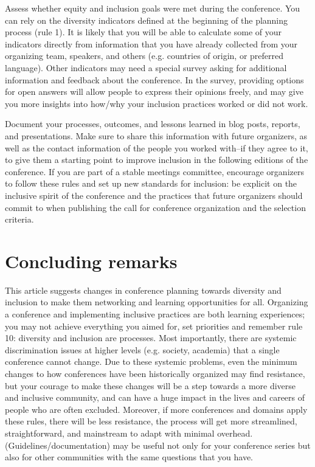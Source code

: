 \documentclass[10pt,letterpaper]{article}
\begin{document}
Assess whether equity and inclusion goals were met during the conference. 
You can rely on the diversity indicators defined at the beginning of the planning process (rule 1). 
It is likely that you will be able to calculate some of your indicators directly from information that you have already collected from your organizing team, speakers, and others (e.g. countries of origin, or preferred language).
Other indicators may need a special survey asking for additional information and feedback about the conference. 
In the survey, providing options for open answers will allow people to express their opinions freely, and may give you more insights into how/why your inclusion practices worked or did not work. 

Document your processes, outcomes, and lessons learned in blog posts, reports, and presentations. 
Make sure to share this information with future organizers, as well as the contact information of the people you worked with--if they agree to it, to give them a starting point to improve inclusion in the following editions of the conference.
If you are part of a stable meetings committee, encourage organizers to follow these rules and set up new standards for inclusion: be explicit on the inclusive spirit of the conference and the practices that future organizers should commit to when publishing the call for conference organization and the selection criteria. 


\section*{Concluding remarks}

This article suggests changes in conference planning towards diversity and inclusion to make them networking and learning opportunities for all. 
Organizing a conference and implementing inclusive practices are both learning experiences;
you may not achieve everything you aimed for, set priorities and remember rule 10: diversity and inclusion are processes. 
Most importantly, there are systemic discrimination issues at higher levels (e.g. society, academia) that a single conference cannot change. 
Due to these systemic problems, even the minimum changes to how conferences have been historically organized may find resistance, but your courage to make these changes will be a step towards a more diverse and inclusive community, and can have a huge impact in the lives and careers of people who are often excluded.
Moreover, if more conferences and domains apply these rules, there will be less resistance, the process will get more streamlined, straightforward, and mainstream to adapt with minimal overhead.
(Guidelines/documentation) may be useful not only for your conference series but also for other communities with the same questions that you have. %
\end{document}

